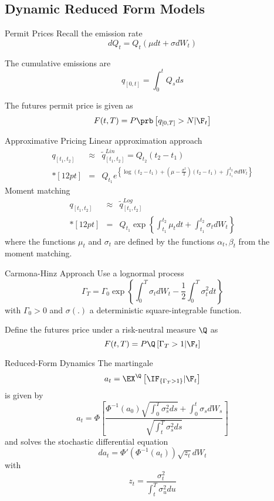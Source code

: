 \subsection{Dynamic Reduced Form Models}

Permit Prices
	Recall the emission rate
		$$
		dQ_t = Q_t(\mu dt + \sigma dW_t)
		$$

	The cumulative emissions are
		$$
		q_{[0,t]} = \int_0^t Q_s ds
		$$

	The futures permit price is given as
		$$
		F(t,T) = P \prb\left[q_{[0,T]}>N |\F_t\right]
		$$


Approximative Pricing
	Linear approximation approach
		$$
		\begin{array}{lll}
		q_{[t_1,t_2]} &\approx& \tilde{q}^{Lin}_{[t_1,t_2]} = Q_{t_2} (t_2 - t_1) \\*[12pt]
		&=&\displaystyle   Q_{t_1} e^{\left\{\log (t_2 - t_1) + \left(\mu-\frac{\sigma^2}{2}\right)(t_2-t_1)+\int_{t_1}^{t_2}\sigma dW_t\right\}}
		\end{array}
		$$
	Moment matching
		$$
		\begin{array}{lll}
		q_{[t_1,t_2]} &\approx& \tilde{q}^{Log}_{[t_1,t_2]}\\*[12pt]
		&=& Q_{t_1} \exp\left\{ \int_{t_1}^{t_2}\mu_t dt + \int_{t_1}^{t_2} \sigma_t dW_t\right\}
		\end{array}
		$$
	where the functions $\mu_t$ and $\sigma_t$ are defined by the functions $\alpha_t, \beta_t$ from the moment matching.




Carmona-Hinz Approach
	Use a lognormal process
		$$
		\Gamma_{T}= \Gamma_0  \exp{\left\{\int_{0}^{T}\sigma_t dW_t -\frac{1}{2}\int_0^T \sigma^2_t dt\right\}}
		$$
	with $\Gamma_0 >0$ and $\sigma(.)$ a deterministic square-integrable function.
 
	Define the futures price under a risk-neutral measure $\Q$ as
		$$
		F(t,T) = P \Q\left[\Gamma_T>1 |\F_t\right]
		$$



Reduced-Form Dynamics
	The martingale
		$$
		a_t = \EX^\Q\left[\IF_{\{\Gamma_T>1\}} |\F_t\right]
		$$
	is given by
		$$
		a_t= \Phi \left[\frac{\Phi^{-1}(a_0) \sqrt{\int_0^T \sigma^2_s ds}+\int_0^t \sigma_s dW_s}{\sqrt{\int_t^T \sigma^2_s ds}}\right]
		$$
	and solves the stochastic differential equation
		$$
		da_t = \Phi'\left(\Phi^{-1}(a_t)\right)\sqrt{z_t}dW_t
		$$
	with
		$$
		z_t=\frac{\sigma_t^2}{\int_t^T \sigma^2_u du}
		$$


